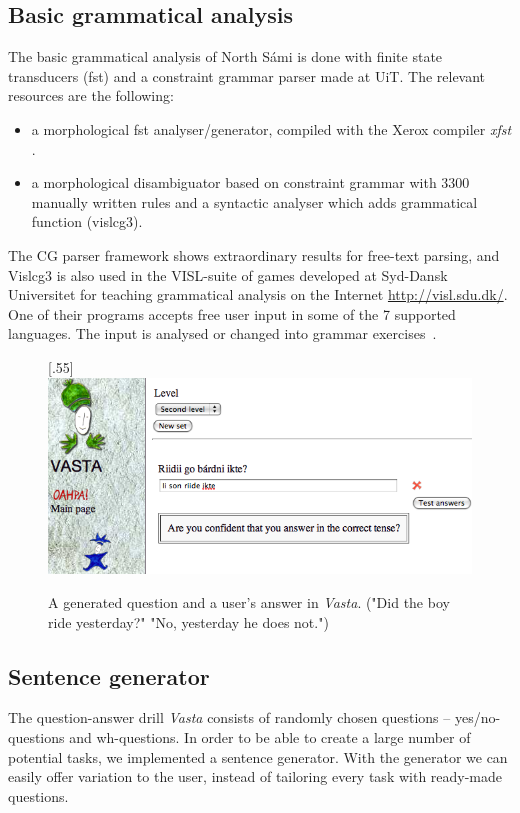 \documentclass[11pt]{article}
\begin{document}
\subsection{Basic grammatical analysis}
The basic grammatical analysis of North Sámi is done with finite state transducers (fst) and a constraint grammar parser made at UiT. The relevant resources are the following:
\begin{itemize}
\item a morphological fst analyser/generator, compiled with the Xerox compiler \textit{xfst} \cite{BeesleyKarttunen:03}.  
\item a morphological disambiguator based on constraint grammar with 3300 manually written rules and a syntactic analyser which adds grammatical function (vislcg3). 
\end{itemize} 

The CG parser framework shows extraordinary results for free-text parsing, and Vislcg3 is also used in the VISL-suite of games developed at Syd-Dansk Universitet for teaching grammatical analysis on the Internet \url{http://visl.sdu.dk/}. One of their  programs accepts free user input in some of the 7 supported languages. The input is analysed or changed into grammar exercises~\cite{Bick:05}.


\begin{figure}[htbp]
\begin{center}
\scalebox{.55}[.55]{\includegraphics{presentation/img/newvasta.png}}\\
\caption{A generated question and a user's answer in \textit{Vasta}. ("Did the boy ride yesterday?" "No, yesterday he does not.")}
\label{vastasent}
\end{center}
\end{figure}


\subsection{Sentence generator}
The question-answer drill \textit{Vasta} consists of randomly chosen questions -- yes/no-questions and wh-questions. In order to be able to create a large number of potential tasks, we implemented a sentence generator. With the generator we can easily offer variation to the user, instead of tailoring every task with ready-made questions.
\end{document}
